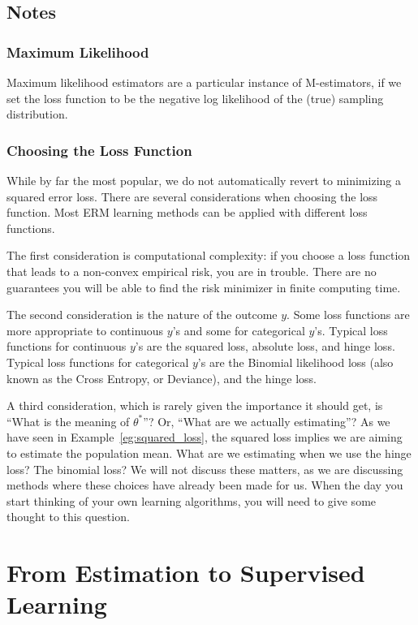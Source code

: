 \subsection{Notes}

\subsubsection{Maximum Likelihood} 
Maximum likelihood estimators are a particular instance of M-estimators, if we set the loss function to be the negative log likelihood of the (true) sampling distribution.


\subsubsection{Choosing the Loss Function}
While by far the most popular, we do not automatically revert to minimizing a squared error loss.
There are several considerations when choosing the loss function.
Most ERM learning methods can be applied with different loss functions. 

The first consideration is computational complexity: if you choose a loss function that leads to a non-convex empirical risk, you are in trouble. There are no guarantees you will be able to find the risk minimizer in finite computing time.

The second consideration is the nature of the outcome $y$. Some loss functions are more appropriate to continuous $y$'s and some for categorical $y$'s. Typical loss functions for continuous $y$'s are the squared loss, absolute loss, and hinge loss.
Typical loss functions for categorical $y$'s are the Binomial likelihood loss (also known as the Cross Entropy, or Deviance), and the hinge loss. 

A third consideration, which is rarely given the importance it should get, is ``What is the meaning of $\theta^*$''? Or, ``What are we actually estimating''?
As we have seen in Example~\ref{eg:squared_loss}, the squared loss implies we are aiming to estimate the population mean.
What are we estimating when we use the hinge loss? The binomial loss? 
We will not discuss these matters, as we are discussing methods where these choices have already been made for us. 
When the day you start thinking of your own learning algorithms, you will need to give some thought to this question.



\section{From Estimation to Supervised Learning}
\label{sec:learning}

